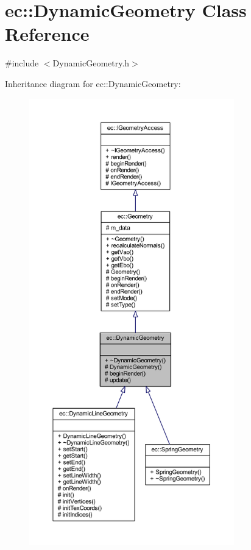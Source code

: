 \hypertarget{classec_1_1_dynamic_geometry}{}\section{ec\+:\+:Dynamic\+Geometry Class Reference}
\label{classec_1_1_dynamic_geometry}


{\ttfamily \#include $<$Dynamic\+Geometry.\+h$>$}



Inheritance diagram for ec\+:\+:Dynamic\+Geometry\+:\nopagebreak
\begin{figure}[H]
\begin{center}
\leavevmode
\includegraphics[height=550pt]{classec_1_1_dynamic_geometry__inherit__graph}
\end{center}
\end{figure}


